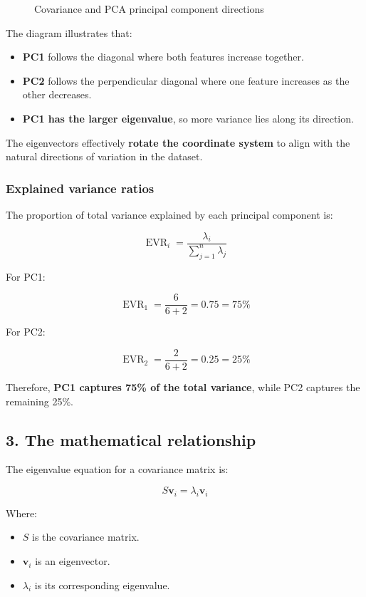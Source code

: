 \documentclass[11pt]{article}
\makeatletter
\providecommand{\tightlist}{%
      \setlength{\itemsep}{0pt}\setlength{\parskip}{0pt}}
\newcommand*\pandocbounded[1]{%
      \sbox\pandoc@box{#1}%
      \Gscale@div\@tempa\textheight{\dimexpr\ht\pandoc@box+\dp\pandoc@box\relax}%
      \Gscale@div\@tempb\linewidth{\wd\pandoc@box}%
      \ifdim\@tempb\p@<\@tempa\p@
        \let\@tempa\@tempb
      \fi
      \ifdim\@tempa\p@<\p@
        \scalebox{\@tempa}{\usebox\pandoc@box}%
      \else
        \usebox{\pandoc@box}%
      \fi
    }
\makeatother
\begin{document}
\begin{figure}
\centering
\pandocbounded{}
\caption{Covariance and PCA principal component directions}
\end{figure}

The diagram illustrates that:

\begin{itemize}
\tightlist
\item
  \textbf{PC1} follows the diagonal where both features increase
  together.
\item
  \textbf{PC2} follows the perpendicular diagonal where one feature
  increases as the other decreases.
\item
  \textbf{PC1 has the larger eigenvalue}, so more variance lies along
  its direction.
\end{itemize}

The eigenvectors effectively \textbf{rotate the coordinate system} to
align with the natural directions of variation in the dataset.

\subsubsection{Explained variance
ratios}\label{explained-variance-ratios}

The proportion of total variance explained by each principal component
is:

\[
\operatorname{EVR}_i =
\frac{\lambda_i}{\sum_{j=1}^{n}\lambda_j}
\]

For PC1:

\[
\operatorname{EVR}_1 =
\frac{6}{6+2}
= 0.75 = 75\%
\]

For PC2:

\[
\operatorname{EVR}_2 =
\frac{2}{6+2}
= 0.25 = 25\%
\]

Therefore, \textbf{PC1 captures 75\% of the total variance}, while PC2
captures the remaining 25\%.

\subsection{3. The mathematical
relationship}\label{the-mathematical-relationship}

The eigenvalue equation for a covariance matrix is:

\[
S\mathbf{v}_i = \lambda_i\mathbf{v}_i
\]

Where:

\begin{itemize}
\tightlist
\item
  \(S\) is the covariance matrix.
\item
  \(\mathbf{v}_i\) is an eigenvector.
\item
  \(\lambda_i\) is its corresponding eigenvalue.
\end{itemize}
\end{document}
